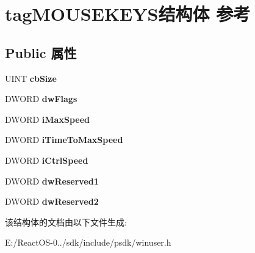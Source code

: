 \hypertarget{structtag_m_o_u_s_e_k_e_y_s}{}\section{tag\+M\+O\+U\+S\+E\+K\+E\+Y\+S结构体 参考}
\label{structtag_m_o_u_s_e_k_e_y_s}
\subsection*{Public 属性}
\begin{DoxyCompactItemize}
\item 
\mbox{\label{structtag_m_o_u_s_e_k_e_y_s_a995379452a8ec3bbb56f167fcb067fcf}} 
U\+I\+NT {\bfseries cb\+Size}
\item 
\mbox{\label{structtag_m_o_u_s_e_k_e_y_s_a9eb75fa899e4d80e290320e417fb9c15}} 
D\+W\+O\+RD {\bfseries dw\+Flags}
\item 
\mbox{\label{structtag_m_o_u_s_e_k_e_y_s_a20029530e33146cd0bcaea193e0954df}} 
D\+W\+O\+RD {\bfseries i\+Max\+Speed}
\item 
\mbox{\label{structtag_m_o_u_s_e_k_e_y_s_a8e8b8eb36d5ab3d9ccbfd23fe157f16f}} 
D\+W\+O\+RD {\bfseries i\+Time\+To\+Max\+Speed}
\item 
\mbox{\label{structtag_m_o_u_s_e_k_e_y_s_ad8dd905f0a9d2beb5264ae6167583a8d}} 
D\+W\+O\+RD {\bfseries i\+Ctrl\+Speed}
\item 
\mbox{\label{structtag_m_o_u_s_e_k_e_y_s_a59398e9e8ccbd895620951f0e3cb3f17}} 
D\+W\+O\+RD {\bfseries dw\+Reserved1}
\item 
\mbox{\label{structtag_m_o_u_s_e_k_e_y_s_a9723bfff14b0317ba55df6823498e3a6}} 
D\+W\+O\+RD {\bfseries dw\+Reserved2}
\end{DoxyCompactItemize}


该结构体的文档由以下文件生成\+:\begin{DoxyCompactItemize}
\item 
E\+:/\+React\+O\+S-\/0../sdk/include/psdk/winuser.\+h\end{DoxyCompactItemize}
